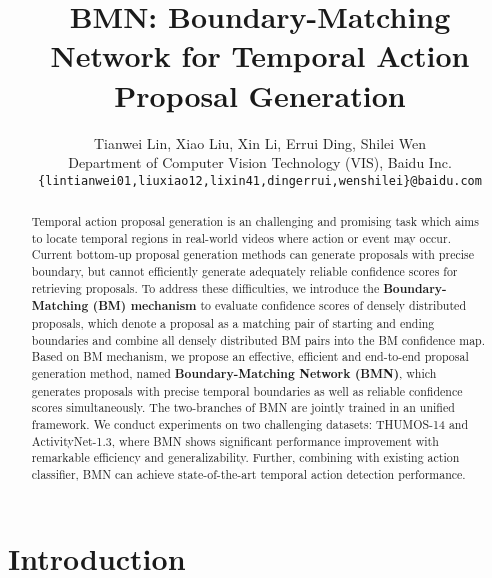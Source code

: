 \documentclass[10pt,twocolumn,letterpaper]{article}
\begin{document}
\title{BMN: Boundary-Matching Network for Temporal Action Proposal Generation}

\author{Tianwei Lin, Xiao Liu, Xin Li, Errui Ding, Shilei Wen\\
Department of Computer Vision Technology (VIS), Baidu Inc.\\
{\tt\small \{lintianwei01,liuxiao12,lixin41,dingerrui,wenshilei\}@baidu.com}
}


\maketitle
\ificcvfinal\thispagestyle{empty}\fi

\begin{abstract}

Temporal action proposal generation is an challenging and promising task which aims to locate temporal regions in real-world videos where action or event may occur.
Current bottom-up proposal generation methods can generate proposals with precise boundary, but cannot efficiently generate adequately reliable confidence scores for retrieving proposals.
To address these difficulties, we introduce the \textbf{Boundary-Matching (BM) mechanism} to evaluate confidence scores of densely distributed proposals, which denote a proposal as a matching pair of starting and ending boundaries and combine all densely distributed BM pairs into the BM confidence map.
Based on BM mechanism, we propose an effective, efficient and end-to-end   proposal generation method, named \textbf{Boundary-Matching Network (BMN)}, which generates proposals with precise temporal boundaries as well as reliable confidence scores simultaneously.
The two-branches of BMN are jointly trained in an unified framework.
We conduct experiments on two challenging datasets: THUMOS-14 and ActivityNet-1.3, where BMN shows significant performance improvement with remarkable efficiency and generalizability. Further, combining with existing action classifier, BMN can achieve state-of-the-art temporal action detection performance.

\end{abstract}

\section{Introduction}
\end{document}
